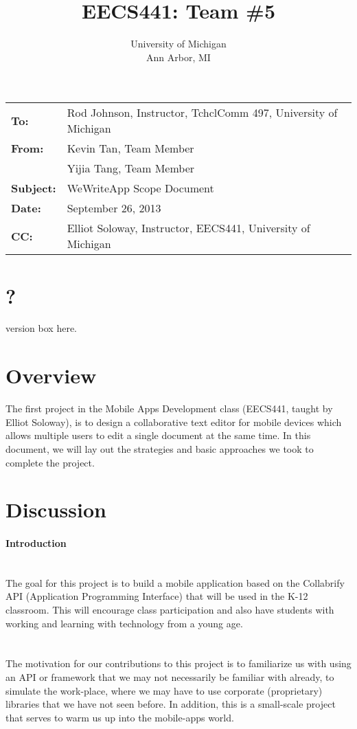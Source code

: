 \documentclass[10pt]{article}
\title{EECS441: Team \#5}
\author{ University of Michigan \\ Ann Arbor, MI}
\date{}
\begin{document}
\maketitle

\begin{tabular}{ll}
	\textbf{To:} & Rod Johnson, Instructor, TchclComm 497, University of Michigan \\
	\textbf{From:} & Kevin Tan, Team Member \\
			     &  Yijia Tang, Team Member \\
         \textbf{Subject:} & WeWriteApp Scope Document \\
	\textbf{Date:} & September 26, 2013 \\
    \textbf{CC:} & Elliot Soloway, Instructor, EECS441, University of Michigan \\
\end{tabular}

\section*{?}
version box here.

\section{Overview}
The first project in the Mobile Apps Development class (EECS441, taught by Elliot Soloway), 
is to design a collaborative text editor for mobile devices which allows multiple users to
 edit a single document at the same time. In this document, we will lay out the strategies
 and basic approaches we took to complete the project.

\newpage

\section{Discussion}
\paragraph{Introduction} ~ \\
\noindent
The goal for this project is to build a mobile application based on the Collabrify API 
(Application Programming Interface) that will be used in the K-12 classroom. This will
 encourage class participation and also have students with working and learning with
 technology from a young age.

\paragraph{} ~\\
\noindent
The motivation for our contributions to this project is to familiarize us with using an API
 or framework that we may not necessarily be familiar with already, to simulate the work-place, 
where we may have to use corporate (proprietary) libraries that we have not seen before.  
In addition, this is a small-scale project that serves to warm us up into the mobile-apps world.
\end{document}
